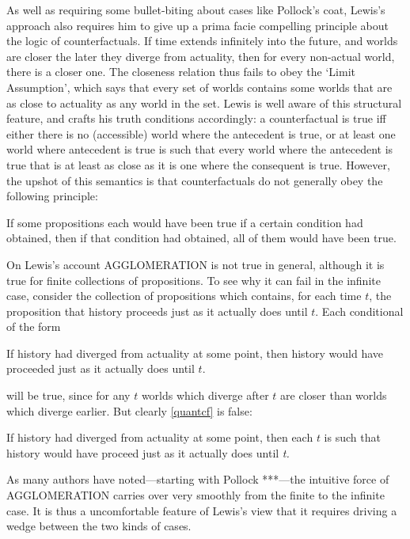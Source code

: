 \documentclass[If.tex]{subfiles}
\begin{document}
\begin{prop}
As well as requiring some bullet-biting about cases like Pollock's coat, Lewis's approach also requires him to give up a prima facie compelling principle about the logic of counterfactuals. If time extends infinitely into the future, and worlds are closer the later they diverge from actuality, then for every non-actual world, there is a closer one. The closeness relation thus fails to obey the ‘Limit Assumption’, which says that every set of worlds contains some worlds that are as close to actuality as any world in the set. Lewis is well aware of this structural feature, and crafts his truth conditions accordingly: a counterfactual is true iff either there is no (accessible) world where the antecedent is true, or at least one world where antecedent is true is such that every world where the antecedent is true that is at least as close as it is one where the consequent is true. However, the upshot of this semantics is that counterfactuals do not generally obey the following principle:
\begin{prop}  
	\litem[Agglomeration] \label{agglomeration}
	If some propositions each would have been true if a certain condition had obtained, then if that condition had obtained, all of them would have been true.
\end{prop}
On Lewis's account AGGLOMERATION is not true in general, although it is true for finite collections of propositions. To see why it can fail in the infinite case, consider the collection of propositions which contains, for each time $t$, the proposition that history proceeds just as it actually does until $t$. Each conditional of the form
\begin{prop}
	\nitem \label{cfquant}
		If history had diverged from actuality at some point, then history would have proceeded just as it actually does until $t$.
\end{prop}
will be true, since for any $t$ worlds which diverge after $t$ are closer than worlds which diverge earlier. But clearly \ref{quantcf} is false:
\begin{prop}
	\nitem \label{quantcf}
		If history had diverged from actuality at some point, then each $t$ is such that history would have proceed just as it actually does until \emph{t.}
\end{prop}
As many authors have noted---starting with Pollock ***---the intuitive force of AGGLOMERATION carries over very smoothly from the finite to the infinite case. It is thus a uncomfortable feature of Lewis's view that it requires driving a wedge between the two kinds of cases.


\end{prop}
\end{document}
